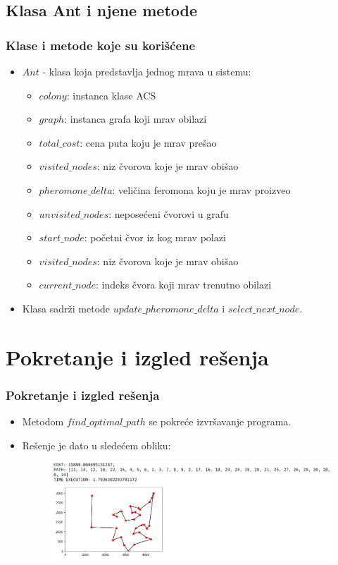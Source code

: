 \documentclass[11pt]{beamer}
\begin{document}
\subsection{Klasa Ant i njene metode}
\begin{frame}{}
\frametitle{Klase i metode koje su korišćene}
\begin{itemize}
  \item $Ant$ - klasa koja predstavlja jednog mrava u sistemu:
  	\begin{itemize}
  		\item $colony$: instanca klase ACS
  		\item $graph$: instanca grafa koji mrav obilazi
  		\item $total\_cost$: cena puta koju je mrav prešao 
		\item $visited\_nodes$: niz čvorova koje je mrav obišao
		\item $pheromone\_delta$: veličina feromona koju je mrav proizveo
		\item $unvisited\_nodes$: neposećeni čvorovi u grafu
		\item $start\_node$: početni čvor iz kog mrav polazi
		\item $visited\_nodes$: niz čvorova koje je mrav obišao
		\item $current\_node$: indeks čvora koji mrav trenutno obilazi
  	\end{itemize}
  \item Klasa sadrži metode $update\_pheromone\_delta$ i $select\_next\_node$.
\end{itemize}
\end{frame}


\section{Pokretanje i izgled rešenja}
\begin{frame}{}
\frametitle{Pokretanje i izgled rešenja}
\begin{itemize}
  \item Metodom $find\_optimal\_path$ se pokreće izvršavanje programa.
  \item Rešenje je dato u sledećem obliku:
  		\begin{figure}[h!]
		\begin{center}
			\includegraphics[scale=0.3]{opt.png}
		\end{center}
		\label{fig:optres}
		\end{figure}
\end{itemize}
\end{frame}
\end{document}
